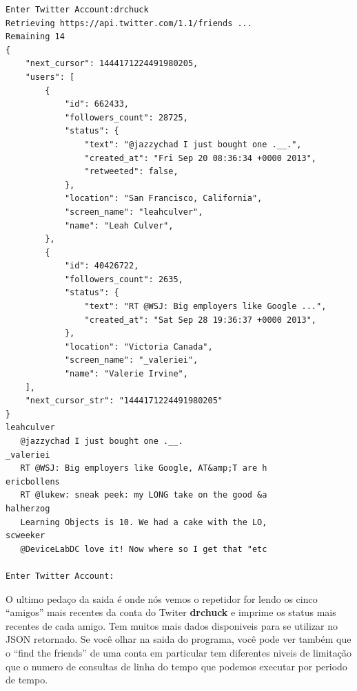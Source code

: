 \beforeverb
\begin{verbatim}
Enter Twitter Account:drchuck
Retrieving https://api.twitter.com/1.1/friends ...
Remaining 14
{
    "next_cursor": 1444171224491980205, 
    "users": [
        {
            "id": 662433, 
            "followers_count": 28725, 
            "status": {
                "text": "@jazzychad I just bought one .__.", 
                "created_at": "Fri Sep 20 08:36:34 +0000 2013", 
                "retweeted": false, 
            }, 
            "location": "San Francisco, California", 
            "screen_name": "leahculver", 
            "name": "Leah Culver", 
        }, 
        {
            "id": 40426722, 
            "followers_count": 2635, 
            "status": {
                "text": "RT @WSJ: Big employers like Google ...", 
                "created_at": "Sat Sep 28 19:36:37 +0000 2013", 
            }, 
            "location": "Victoria Canada", 
            "screen_name": "_valeriei", 
            "name": "Valerie Irvine", 
    ], 
    "next_cursor_str": "1444171224491980205"
}
leahculver
   @jazzychad I just bought one .__.
_valeriei
   RT @WSJ: Big employers like Google, AT&amp;T are h
ericbollens
   RT @lukew: sneak peek: my LONG take on the good &a
halherzog
   Learning Objects is 10. We had a cake with the LO,
scweeker
   @DeviceLabDC love it! Now where so I get that "etc

Enter Twitter Account:
\end{verbatim}
\afterverb
%
O ultimo pedaço da saida é onde nós vemos o repetidor for lendo os
cinco ``amigos'' mais recentes da conta do Twiter {\bf drchuck} e
imprime os status mais recentes de cada amigo. Tem muitos mais dados
disponiveis para se utilizar no JSON retornado. Se você olhar na 
saida do programa, você pode ver também que o ``find the friends'' de
uma conta em particular tem diferentes niveis de limitação que 
o numero de consultas de linha do tempo que podemos executar por 
periodo de tempo.


